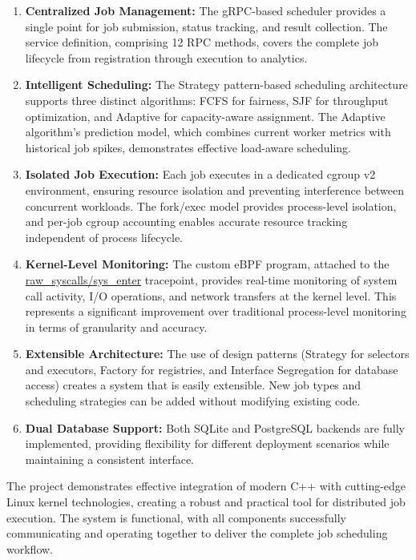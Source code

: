 \begin{enumerate}
	\item \textbf{Centralized Job Management:} The gRPC-based scheduler provides a single point for job submission, status tracking, and result collection. The service definition, comprising 12 RPC methods, covers the complete job lifecycle from registration through execution to analytics.

	\item \textbf{Intelligent Scheduling:} The Strategy pattern-based scheduling architecture supports three distinct algorithms: FCFS for fairness, SJF for throughput optimization, and Adaptive for capacity-aware assignment. The Adaptive algorithm's prediction model, which combines current worker metrics with historical job spikes, demonstrates effective load-aware scheduling.

	\item \textbf{Isolated Job Execution:} Each job executes in a dedicated cgroup v2 environment, ensuring resource isolation and preventing interference between concurrent workloads. The fork/exec model provides process-level isolation, and per-job cgroup accounting enables accurate resource tracking independent of process lifecycle.

	\item \textbf{Kernel-Level Monitoring:} The custom eBPF program, attached to the \url{raw_syscalls/sys_enter} tracepoint, provides real-time monitoring of system call activity, I/O operations, and network transfers at the kernel level. This represents a significant improvement over traditional process-level monitoring in terms of granularity and accuracy.

	\item \textbf{Extensible Architecture:} The use of design patterns (Strategy for selectors and executors, Factory for registries, and Interface Segregation for database access) creates a system that is easily extensible. New job types and scheduling strategies can be added without modifying existing code.

	\item \textbf{Dual Database Support:} Both SQLite and PostgreSQL backends are fully implemented, providing flexibility for different deployment scenarios while maintaining a consistent interface.
\end{enumerate}

The project demonstrates effective integration of modern C++ with cutting-edge Linux kernel technologies, creating a robust and practical tool for distributed job execution. The system is functional, with all components successfully communicating and operating together to deliver the complete job scheduling workflow.

